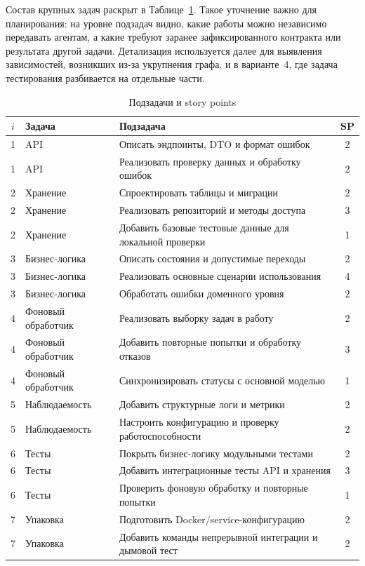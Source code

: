 \documentclass[12pt,a4paper]{article}
\theoremstyle{definition}
\begin{document}
Состав крупных задач раскрыт в Таблице~\ref{tab:practical-subtasks}. Такое уточнение важно для планирования: на уровне подзадач видно, какие работы можно независимо передавать агентам, а какие требуют заранее зафиксированного контракта или результата другой задачи. Детализация используется далее для выявления зависимостей, возникших из-за укрупнения графа, и в варианте~4, где задача тестирования разбивается на отдельные части.

\begin{table}[ht!]
\centering
\caption{Подзадачи и story points}
\label{tab:practical-subtasks}
\begin{tabularx}{\textwidth}{@{}c>{\raggedright\arraybackslash}p{}>{\raggedright\arraybackslash}Xc@{}}
\toprule
$i$ & Задача & Подзадача & SP \\
\midrule
1 & API & Описать эндпоинты, DTO и формат ошибок & 2 \\
1 & API & Реализовать проверку данных и обработку ошибок & 2 \\
2 & Хранение & Спроектировать таблицы и миграции & 2 \\
2 & Хранение & Реализовать репозиторий и методы доступа & 3 \\
2 & Хранение & Добавить базовые тестовые данные для локальной проверки & 1 \\
3 & Бизнес-логика & Описать состояния и допустимые переходы & 2 \\
3 & Бизнес-логика & Реализовать основные сценарии использования & 4 \\
3 & Бизнес-логика & Обработать ошибки доменного уровня & 2 \\
4 & Фоновый обработчик & Реализовать выборку задач в работу & 2 \\
4 & Фоновый обработчик & Добавить повторные попытки и обработку отказов & 3 \\
4 & Фоновый обработчик & Синхронизировать статусы с основной моделью & 1 \\
5 & Наблюдаемость & Добавить структурные логи и метрики & 2 \\
5 & Наблюдаемость & Настроить конфигурацию и проверку работоспособности & 2 \\
6 & Тесты & Покрыть бизнес-логику модульными тестами & 2 \\
6 & Тесты & Добавить интеграционные тесты API и хранения & 3 \\
6 & Тесты & Проверить фоновую обработку и повторные попытки & 1 \\
7 & Упаковка & Подготовить Docker/service-конфигурацию & 2 \\
7 & Упаковка & Добавить команды непрерывной интеграции и дымовой тест & 2 \\
\bottomrule
\end{tabularx}
\end{table}
\end{document}
